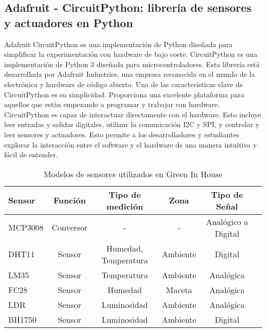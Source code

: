    \subsection{Adafruit - CircuitPython: librería de sensores y actuadores en Python}
    Adafruit CircuitPython \cite{wiki:adafruit_circuit_python} es una implementación de Python diseñada para simplificar la experimentación con hardware de bajo coste. CircuitPython es una implementación de Python 3 diseñada para microcontroladores. Esta librería está desarrollada por Adafruit Industries, una empresa reconocida en el mundo de la electrónica y hardware de código abierto.    
    Una de las características clave de CircuitPython es su simplicidad. Proporciona una excelente plataforma para aquellos que están empezando a programar y trabajar con hardware. CircuitPython es capaz de interactuar directamente con el hardware. Esto incluye leer entradas y salidas digitales, utilizar la comunicación I2C y SPI, y controlar y leer sensores y actuadores. Esto permite a los desarrolladores y estudiantes explorar la interacción entre el software y el hardware de una manera intuitiva y fácil de entender.
    \begin{table}[ht]
    \resizebox{13cm}{!} {
    \centering
    \begin{tabular}{|l|c|c|c|c|c|}
    \hline \textbf{Sensor} & \textbf{Función} & \textbf{Tipo de medición} & \textbf{Zona} & \textbf{Tipo de Señal} \\
    \hline MCP3008 & Conversor & - & - & Analógico a Digital \\
    \hline DHT11 & Sensor & Humedad, Temperatura & Ambiente & Digital \\
    \hline LM35 & Sensor & Temperatura & Ambiente & Analógica \\
    \hline FC28 & Sensor & Humedad & Maceta & Analógica \\
    \hline LDR & Sensor & Luminosidad & Ambiente & Analógica \\
    \hline BH1750 & Sensor & Luminosidad & Ambiente & Digital \\
    \hline
    \end{tabular}
    }
    \caption{Modelos de sensores utilizados en Green In House}
    \end{table}


